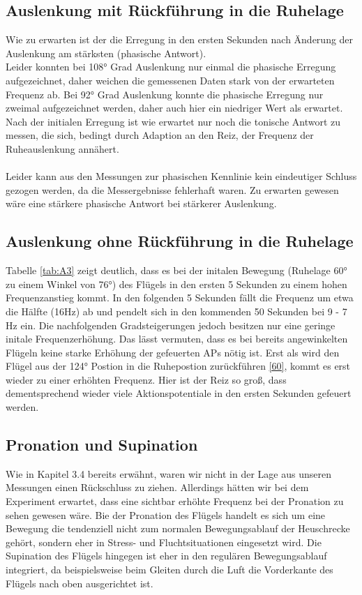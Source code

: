 \documentclass[a4paper]{article}
\begin{document}
\subsection{Auslenkung mit Rückführung in die Ruhelage}
Wie zu erwarten ist der die Erregung in den ersten Sekunden nach Änderung der Auslenkung am stärksten (phasische Antwort).\\
Leider konnten bei \ang{108} Grad Auslenkung nur einmal die phasische Erregung aufgezeichnet, daher weichen die gemessenen Daten stark von der erwarteten Frequenz ab. Bei \ang{92} Grad Auslenkung konnte die phasische Erregung nur zweimal aufgezeichnet werden, daher auch hier ein niedriger Wert als erwartet.\\
Nach der initialen Erregung ist wie erwartet nur noch die tonische Antwort zu messen, die sich, bedingt durch Adaption an den Reiz, der Frequenz der Ruheauslenkung annähert.\\ \\
Leider kann aus den Messungen zur phasischen Kennlinie kein eindeutiger Schluss gezogen werden, da die Messergebnisse fehlerhaft waren. Zu erwarten gewesen wäre eine stärkere phasische Antwort bei stärkerer Auslenkung.\\

\subsection{Auslenkung ohne Rückführung in die Ruhelage}

Tabelle \ref{tab:A3} zeigt deutlich, dass es bei der initalen Bewegung (Ruhelage \ang{60} zu einem Winkel von \ang{76}) des Flügels in den ersten 5 Sekunden zu einem hohen Frequenzanstieg kommt. In den folgenden 5 Sekunden fällt die Frequenz um etwa die Hälfte (16Hz) ab und pendelt sich in den kommenden 50 Sekunden bei 9 - 7 Hz ein. Die nachfolgenden Gradsteigerungen jedoch besitzen nur eine geringe initale Frequenzerhöhung. Das lässt vermuten, dass es bei bereits angewinkelten Flügeln keine starke Erhöhung der gefeuerten APs nötig ist. Erst als wird den Flügel aus der \ang{124} Postion in die Ruhepostion zurückführen \ref{60}, kommt es erst wieder zu einer erhöhten Frequenz. Hier ist der Reiz so groß, dass dementsprechend wieder viele Aktionspotentiale in den ersten Sekunden gefeuert werden.

\subsection{Pronation und Supination}
Wie in Kapitel 3.4 bereits erwähnt, waren wir nicht in der Lage aus unseren Messungen einen Rückschluss zu ziehen. Allerdings hätten wir bei dem Experiment erwartet, dass eine sichtbar erhöhte Frequenz bei der Pronation zu sehen gewesen wäre. Bie der Pronation des Flügels handelt es sich um eine Bewegung die tendenziell nicht zum normalen Bewegungsablauf der Heuschrecke gehört, sondern eher in Stress- und Fluchtsituationen eingesetzt wird. Die Supination des Flügels hingegen ist eher in den regulären Bewegungsablauf integriert, da beispielsweise beim Gleiten durch die Luft die Vorderkante des Flügels nach oben ausgerichtet ist. 

\printbibliography
\end{document}
